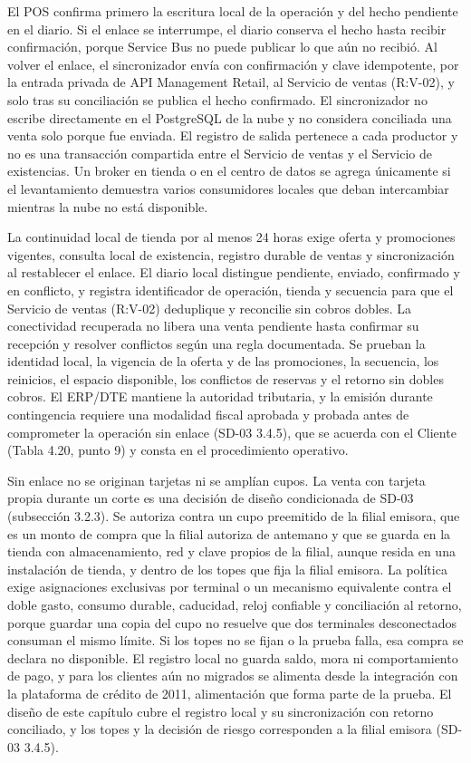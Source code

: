\documentclass[11pt]{article}
\begin{document}
El POS confirma primero la escritura local de la operación y del hecho pendiente en el diario. Si el enlace se interrumpe, el diario conserva el hecho hasta recibir confirmación, porque Service Bus no puede publicar lo que aún no recibió. Al volver el enlace, el sincronizador envía con confirmación y clave idempotente, por la entrada privada de API Management Retail, al Servicio de ventas (R:V-02), y solo tras su conciliación se publica el hecho confirmado. El sincronizador no escribe directamente en el PostgreSQL de la nube y no considera conciliada una venta solo porque fue enviada. El registro de salida pertenece a cada productor y no es una transacción compartida entre el Servicio de ventas y el Servicio de existencias. Un broker en tienda o en el centro de datos se agrega únicamente si el levantamiento demuestra varios consumidores locales que deban intercambiar mientras la nube no está disponible.

La continuidad local de tienda por al menos 24 horas exige oferta y promociones vigentes, consulta local de existencia, registro durable de ventas y sincronización al restablecer el enlace. El diario local distingue pendiente, enviado, confirmado y en conflicto, y registra identificador de operación, tienda y secuencia para que el Servicio de ventas (R:V-02) deduplique y reconcilie sin cobros dobles. La conectividad recuperada no libera una venta pendiente hasta confirmar su recepción y resolver conflictos según una regla documentada. Se prueban la identidad local, la vigencia de la oferta y de las promociones, la secuencia, los reinicios, el espacio disponible, los conflictos de reservas y el retorno sin dobles cobros. El ERP/DTE mantiene la autoridad tributaria, y la emisión durante contingencia requiere una modalidad fiscal aprobada y probada antes de comprometer la operación sin enlace (SD-03 3.4.5), que se acuerda con el Cliente (Tabla 4.20, punto 9) y consta en el procedimiento operativo.

Sin enlace no se originan tarjetas ni se amplían cupos. La venta con tarjeta propia durante un corte es una decisión de diseño condicionada de SD-03 (subsección 3.2.3). Se autoriza contra un cupo preemitido de la filial emisora, que es un monto de compra que la filial autoriza de antemano y que se guarda en la tienda con almacenamiento, red y clave propios de la filial, aunque resida en una instalación de tienda, y dentro de los topes que fija la filial emisora. La política exige asignaciones exclusivas por terminal o un mecanismo equivalente contra el doble gasto, consumo durable, caducidad, reloj confiable y conciliación al retorno, porque guardar una copia del cupo no resuelve que dos terminales desconectados consuman el mismo límite. Si los topes no se fijan o la prueba falla, esa compra se declara no disponible. El registro local no guarda saldo, mora ni comportamiento de pago, y para los clientes aún no migrados se alimenta desde la integración con la plataforma de crédito de 2011, alimentación que forma parte de la prueba. El diseño de este capítulo cubre el registro local y su sincronización con retorno conciliado, y los topes y la decisión de riesgo corresponden a la filial emisora (SD-03 3.4.5).
\end{document}
